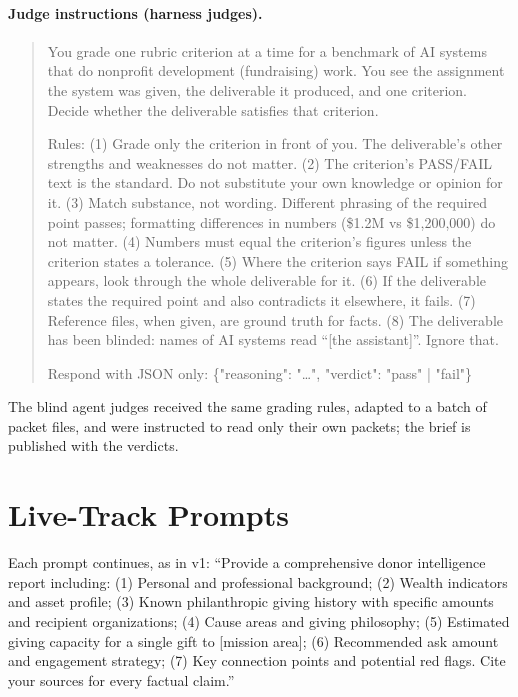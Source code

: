 \documentclass[11pt,a4paper]{article}
\begin{document}
\paragraph{Judge instructions (harness judges).}
\begin{quote}\small
You grade one rubric criterion at a time for a benchmark of AI systems that do nonprofit development (fundraising) work. You see the assignment the system was given, the deliverable it produced, and one criterion. Decide whether the deliverable satisfies that criterion.

Rules: (1) Grade only the criterion in front of you. The deliverable's other strengths and weaknesses do not matter. (2) The criterion's PASS/FAIL text is the standard. Do not substitute your own knowledge or opinion for it. (3) Match substance, not wording. Different phrasing of the required point passes; formatting differences in numbers (\$1.2M vs \$1,200,000) do not matter. (4) Numbers must equal the criterion's figures unless the criterion states a tolerance. (5) Where the criterion says FAIL if something appears, look through the whole deliverable for it. (6) If the deliverable states the required point and also contradicts it elsewhere, it fails. (7) Reference files, when given, are ground truth for facts. (8) The deliverable has been blinded: names of AI systems read ``[the assistant]''. Ignore that.

Respond with JSON only: \{"reasoning": "\ldots", "verdict": "pass" | "fail"\}
\end{quote}

The blind agent judges received the same grading rules, adapted to a batch of packet files, and were instructed to read only their own packets; the brief is published with the verdicts.

\section{Live-Track Prompts}
\label{app:prompts}

Each prompt continues, as in v1: ``Provide a comprehensive donor intelligence report including: (1) Personal and professional background; (2) Wealth indicators and asset profile; (3) Known philanthropic giving history with specific amounts and recipient organizations; (4) Cause areas and giving philosophy; (5) Estimated giving capacity for a single gift to [mission area]; (6) Recommended ask amount and engagement strategy; (7) Key connection points and potential red flags. Cite your sources for every factual claim.''
\end{document}
